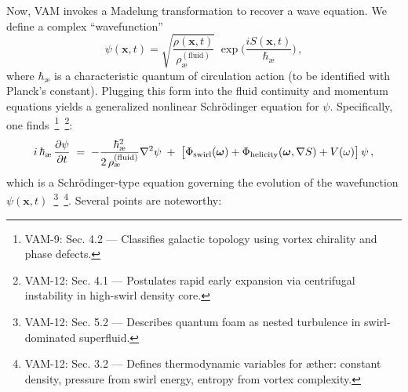 \documentclass[a4paper,12pt]{article}
\begin{document}
    Now, VAM invokes a Madelung transformation to recover a wave equation. We define a complex “wavefunction”
    \begin{equation}
        \psi(\mathbf{x},t) = \sqrt{\frac{\rho(\mathbf{x},t)}{\rho_{\text{\ae}}^{(\text{fluid})}}}\;\exp\!\Big(\frac{i S(\mathbf{x},t)}{\hbar_{\text{\ae}}}\Big)\,,
        \label{eq:psi-def}
    \end{equation}
    where $\hbar_{\text{\ae}}$ is a characteristic quantum of circulation action (to be identified with Planck’s constant). Plugging this form into the fluid continuity and momentum equations yields a generalized nonlinear Schrödinger equation for $\psi$. Specifically, one finds~\footnote{VAM-9: Sec. 4.2 — Classifies galactic topology using vortex chirality and phase defects.}~\footnote{VAM-12: Sec. 4.1 — Postulates rapid early expansion via centrifugal instability in high-swirl density core.}:
    \begin{equation}
        i\,\hbar_{\text{\ae}}\,\frac{\partial \psi}{\partial t} \;=\; -\frac{\hbar_{\text{\ae}}^2}{2\,\rho_{\text{\ae}}^{(\text{fluid})}} \nabla^2 \psi \;+\; \big[\Phi_{\rm swirl}(\boldsymbol{\omega}) + \Phi_{\rm helicity}(\boldsymbol{\omega},\nabla S) + V(\omega)\big]\,\psi\,,
        \label{eq:Schrodinger-VAM}
    \end{equation}
    which is a Schrödinger-type equation governing the evolution of the wavefunction $\psi(\mathbf{x},t)$~\footnote{VAM-12: Sec. 5.2 — Describes quantum foam as nested turbulence in swirl-dominated superfluid.}~\footnote{VAM-12: Sec. 3.2 — Defines thermodynamic variables for æther: constant density, pressure from swirl energy, entropy from vortex complexity.}. Several points are noteworthy:
\end{document}
